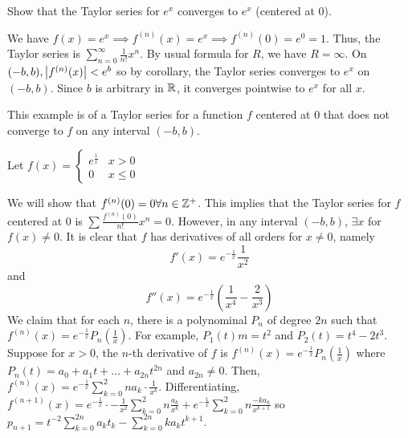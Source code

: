 \documentclass{article}
\begin{document}
        \begin{example}
          Show that the Taylor series for $e^x$ converges to $e^x$ (centered at $0$).

          We have $f(x) = e^x \implies f^{(n)}(x) = e^x \implies f^{(n)}(0) = e^0 = 1$. Thus, the Taylor series is $\sum_{n=0}^\infty \frac{1}{n!}x^n$. By usual formula for $R$, we have $R = \infty$. On $(-b, b), \abs{f^{(n)}(x)} < e^b$ so by corollary, the Taylor series converges to $e^x$ on $(-b, b)$. Since $b$ is arbitrary in $\mathbb{R}$, it converges pointwise to $e^x$ for all $x$.
        \end{example}
        \begin{example}
          This example is of a Taylor series for a function $f$ centered at $0$ that does not converge to $f$ on any interval $(-b, b)$.

          Let $f(x) =
          \begin{cases}
            e^{\frac{1}{x}} & x > 0\\
            0 & x \leq 0
          \end{cases}$

          We will show that $f^{(n)}(0) = 0 \forall n \in \mathbb{Z}^+$.
          This implies that the Taylor series for $f$ centered at $0$ is $\sum \frac{f^{(n)}(0)}{n!}x^n = 0$. However, in any interval $(-b, b)$, $\exists x$ for $f(x) \neq 0$. It is clear that $f$ has derivatives of all orders for $x \neq 0$, namely
          \[
            f'(x) = e^{-\frac{1}{x}} \frac{1}{x^2}
          \] and \[f''(x) = e^{-\frac{1}{x}} \left(\frac{1}{x^4} - \frac{2}{x^3}\right)\]
          We claim that for each $n$, there is a polynominal $P_n$ of degree $2n$ such that $f^{(n)}(x) = e^{-\frac{1}{x}}P_n(\frac{1}{x})$. For example, $P_1(t)m = t^2$ and $P_2(t) = t^4 - 2t^3$. Suppose for $x > 0$, the $n$-th derivative of $f$ is $f^{(n)}(x) = e^{-\frac{1}{x}}P_n(\frac{1}{x})$ where $P_n(t) = a_0 + a_1t + \dots + a_{2n}t^{2n}$ and $a_{2n} \neq 0$. Then, $f^{(n)}(x) = e^{-\frac{1}{x}}\sum_{k=0}^2n a_k \cdot \frac{1}{x^k}$. Differentiating, $f^{(n+1)}(x) = e^{-\frac{1}{x}}\cdot -\frac{1}{x^2}\sum_{k=0}^2n \frac{a_k}{x^k} + e^{-\frac{1}{x}}\sum_{k=0}^2n \frac{-ka_k}{x^{k+1}}$ so $p_{n+1} = t^{-2}\sum_{k=0}^{2n} a_kt_k - \sum_{k=0}^{2n} ka_kt^{k+1}$.


\end{example}
\end{document}
